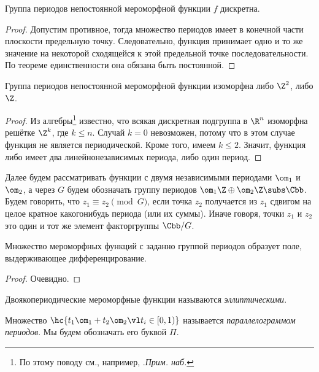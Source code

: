 \documentclass[a4paper]{article}
\begin{document}
\begin{lemma}
Группа периодов непостоянной мероморфной функции $f$ дискретна.
\end{lemma}
\begin{proof}
Допустим противное, тогда множество периодов имеет в конечной части плоскости предельную точку.
Следовательно, функция принимает одно и то же значение на некоторой сходящейся к этой предельной
точке последовательности. По теореме единственности она обязана быть постоянной.
\end{proof}

\begin{imp}
Группа периодов непостоянной мероморфной функции изоморфна либо $\Z^2$, либо $\Z$.
\end{imp}
\begin{proof}
Из алгебры\footnote{По этому поводу см., например,
\cite[гл.\,9,~\S\,1,~теорема\,4]{vinberg}.\т \emph{Прим. наб.}} известно, что всякая дискретная
подгруппа в $\R^n$ изоморфна решётке $\Z^k$, где $k \le n$.
Случай $k = 0$ невозможен, потому что в этом случае функция не является периодической.
Кроме того, имеем $k \le 2$. Значит, функция либо имеет два линейно\д независимых периода,
либо один период.
\end{proof}

Далее будем рассматривать функции с двумя независимыми периодами $\om_1$ и $\om_2$, а
через $G$ будем обозначать группу периодов $\om_1\Z \oplus \om_2\Z \subs \Cbb$.
Будем говорить, что $z_1 \equiv z_2 \pmod G$, если точка $z_2$ получается из $z_1$ сдвигом на
целое кратное какого\д нибудь периода (или их суммы). Иначе говоря, точки $z_1$ и $z_2$\т это один
и тот же элемент факторгруппы $\Cbb/G$.

\begin{stm}
Множество мероморфных функций с заданно группой периодов образует поле, выдерживающее
дифференцирование.
\end{stm}
\begin{proof}
Очевидно.
\end{proof}

\begin{df}
Двоякопериодические мероморфные функции называются \emph{эллиптическими}.
\end{df}

\begin{df}
Множество $\hc{t_1\om_1 + t_2\om_2 \vl t_i \in [0,1)}$ называется \emph{параллелограммом периодов}.
Мы будем обозначать его буквой $\Pi$.
\end{df}
\end{document}
